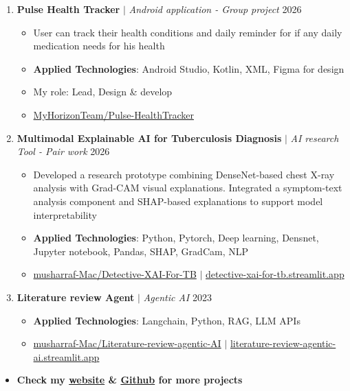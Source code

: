 \documentclass[10pt,a4paper]{article}
\newcommand{\project}[3]{%
  \textbf{#1} $|$ \textit{#2} \hfill #3}
\begin{document}
\begin{enumerate}[resume]
  \item \project{Pulse Health Tracker}{Android application - Group project}{2026}
   \begin{itemize}
    \item User can track their health conditions and daily reminder for if any daily medication needs for his health
    \item \textbf{Applied Technologies}: Android Studio, Kotlin, XML, Figma for design
    \item My role: Lead, Design \& develop
    \item \faGithub \href{https://github.com/MyHorizonTeam/Pulse-HealthTracker}{ MyHorizonTeam/Pulse-HealthTracker}
   \end{itemize}

   \item \project{Multimodal Explainable AI for Tuberculosis Diagnosis}{AI research Tool - Pair work}{2026}
   \begin{itemize}
    \item Developed a research prototype combining DenseNet-based chest X-ray analysis with Grad-CAM visual explanations. Integrated a symptom-text analysis component and SHAP-based explanations to support model interpretability
    \item \textbf{Applied Technologies}: Python, Pytorch, Deep learning, Densnet, Jupyter notebook, Pandas, SHAP, GradCam, NLP
    \item \faGithub \href{https://github.com/musharraf-Mac/Detective-XAI-For-TB}{ musharraf-Mac/Detective-XAI-For-TB} \hspace{0.15cm} $|$ \hspace{0.15cm} \faLink \href{https://detective-xai-for-tb.streamlit.app}{ detective-xai-for-tb.streamlit.app}
   \end{itemize}

   \item \project{Literature review Agent}{Agentic AI}{2023}
   \begin{itemize}
    \item \textbf{Applied Technologies}: Langchain, Python, RAG, LLM APIs
    \item \faGithub \href{https://github.com/musharraf-Mac/Literature-review-agentic-AI}{ musharraf-Mac/Literature-review-agentic-AI} \hspace{0.2cm} $|$ \hspace{0.2cm} \faLink \href{https://literature-review-agentic-ai.streamlit.app/}{ literature-review-agentic-ai.streamlit.app}
   \end{itemize}
\end{enumerate}
\begin{itemize}
  \item \textbf{Check my \href{https://armusharraf.me}{\textcolor{accent}{website}} \& \href{https://github.com/musharraf-Mac}{\textcolor{accent}{Github}} for more projects}
\end{itemize}
\end{document}
